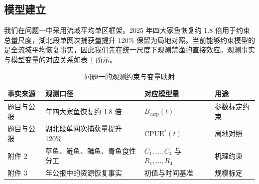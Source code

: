 \subsection{模型建立}
我们在问题一中采用流域平均单区框架。2025 年四大家鱼恢复约 1.8 倍用于约束总量尺度，湖北段单网次捕获量提升 120\% 保留为局地对照。当前能够约束模型的是全流域平均恢复事实，因此我们先在统一尺度下观测禁渔的直接效应。观测事实与模型变量的对应关系如表 \ref{tab:q1_anchor} 所示。
\begin{table}[htbp]
\centering
\caption{问题一的观测约束与变量映射}
\label{tab:q1_anchor}
\begin{tabularx}{0.95\textwidth}{>{\raggedright\arraybackslash}p{2.2cm} >{\raggedright\arraybackslash}p{3.2cm} >{\raggedright\arraybackslash}p{3.2cm} >{\raggedright\arraybackslash}X}
\toprule
事实来源 & 观测口径 & 对应模型量 & 用途 \\
\midrule
题目与公报 & 2025 年四大家鱼恢复约 1.8 倍 & $B_{\text{carp}}(t)$ & 参数标定约束 \\
题目与公报 & 湖北段单网次捕获量提升 120\% & $\mathrm{CPUE}^*(t)$ & 局地对照 \\
附件 2 & 草鱼、鲢鱼、鳙鱼、青鱼食性分工 & $C_1,\dots,C_4$ 与 $R_1,\dots,R_4$ & 机理约束 \\
附件 3 & 2022 年公报中的资源恢复事实 & 初值与时间基准 & 规模标定 \\
\bottomrule
\end{tabularx}
\end{table}

